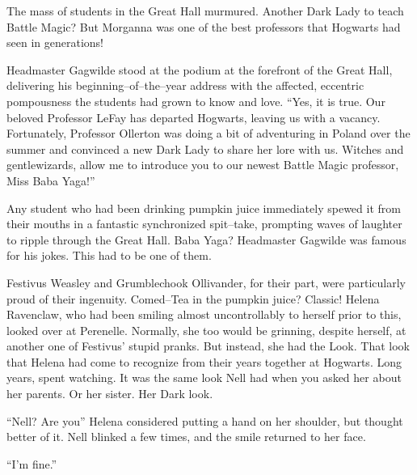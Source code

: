 The mass of students in the Great Hall murmured. Another Dark Lady to teach Battle Magic? But Morganna was one of the best professors that Hogwarts had seen in generations!

Headmaster Gagwilde stood at the podium at the forefront of the Great Hall, delivering his beginning\mbox{--}of\mbox{--}the\mbox{--}year address with the affected, eccentric pompousness the students had grown to know and love. “Yes, it is true. Our beloved Professor LeFay has departed Hogwarts, leaving us with a vacancy. Fortunately, Professor Ollerton was doing a bit of adventuring in Poland over the summer and convinced a new Dark Lady to share her lore with us. Witches and gentlewizards, allow me to introduce you to our newest Battle Magic professor, Miss Baba Yaga!”

Any student who had been drinking pumpkin juice immediately spewed it from their mouths in a fantastic synchronized spit\mbox{--}take, prompting waves of laughter to ripple through the Great Hall. Baba Yaga? Headmaster Gagwilde was famous for his jokes. This had to be one of them.

Festivus Weasley and Grumblechook Ollivander, for their part, were particularly proud of their ingenuity. Comed\mbox{--}Tea in the pumpkin juice? Classic! Helena Ravenclaw, who had been smiling almost uncontrollably to herself prior to this, looked over at Perenelle. Normally, she too would be grinning, despite herself, at another one of Festivus’ stupid pranks. But instead, she had the Look. That look that Helena had come to recognize from their years together at Hogwarts. Long years, spent watching. It was the same look Nell had when you asked her about her parents. Or her sister. Her Dark look.

“Nell? Are you{\el}” Helena considered putting a hand on her shoulder, but thought better of it. Nell blinked a few times, and the smile returned to her face.

“I’m fine.”

